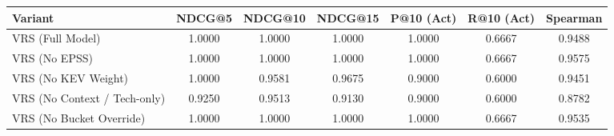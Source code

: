 \begin{table}[h]
\centering
\begin{tabular}{lcccccc}
\hline
Variant & NDCG@5 & NDCG@10 & NDCG@15 & P@10 (Act) & R@10 (Act) & Spearman \\
\hline
VRS (Full Model) & 1.0000 & 1.0000 & 1.0000 & 1.0000 & 0.6667 & 0.9488 \\
VRS (No EPSS) & 1.0000 & 1.0000 & 1.0000 & 1.0000 & 0.6667 & 0.9575 \\
VRS (No KEV Weight) & 1.0000 & 0.9581 & 0.9675 & 0.9000 & 0.6000 & 0.9451 \\
VRS (No Context / Tech-only) & 0.9250 & 0.9513 & 0.9130 & 0.9000 & 0.6000 & 0.8782 \\
VRS (No Bucket Override) & 1.0000 & 1.0000 & 1.0000 & 1.0000 & 0.6667 & 0.9535 \\
\hline
\end{tabular}
\end{table}
